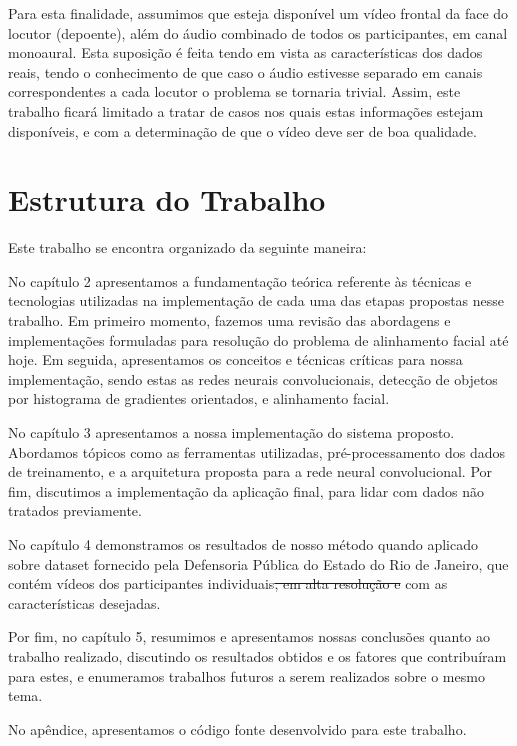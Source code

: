 Para esta finalidade, assumimos que esteja disponível um vídeo frontal da face do locutor (depoente), além do áudio combinado de todos os participantes, em canal monoaural.
Esta suposição é feita tendo em vista as características dos dados reais, tendo o conhecimento de que caso o áudio estivesse separado em canais correspondentes a cada locutor o problema se tornaria trivial.
Assim, este trabalho ficará limitado a tratar de casos nos quais estas informações estejam disponíveis, e com a determinação de que o vídeo deve ser de boa qualidade.

\section{Estrutura do Trabalho}
\label{sec:structure}

Este trabalho se encontra organizado da seguinte maneira:

No capítulo 2 apresentamos a fundamentação teórica referente às técnicas e tecnologias utilizadas na implementação de cada uma das etapas propostas nesse trabalho.
Em primeiro momento, fazemos uma revisão das abordagens e implementações formuladas para resolução do problema de alinhamento facial até hoje. 
Em seguida, apresentamos os conceitos e técnicas críticas para nossa implementação, sendo estas as redes neurais convolucionais, detecção de objetos por histograma de gradientes orientados, e alinhamento facial.

No capítulo 3 apresentamos a nossa implementação do sistema proposto. 
Abordamos tópicos como as ferramentas utilizadas, pré-processamento dos dados de treinamento, e a arquitetura proposta para a rede neural convolucional.
Por fim, discutimos a implementação da aplicação final, para lidar com dados não tratados previamente.

No capítulo 4 demonstramos os resultados de nosso método quando aplicado sobre dataset fornecido pela Defensoria Pública do Estado do Rio de Janeiro, que contém vídeos dos participantes individuais\sout{, em alta resolução e} com as características desejadas.

Por fim, no capítulo 5, resumimos e apresentamos nossas conclusões quanto ao trabalho realizado, discutindo os resultados obtidos e os fatores que contribuíram para estes, e enumeramos trabalhos futuros a serem realizados sobre o mesmo tema.

No apêndice, apresentamos o código fonte desenvolvido para este trabalho.